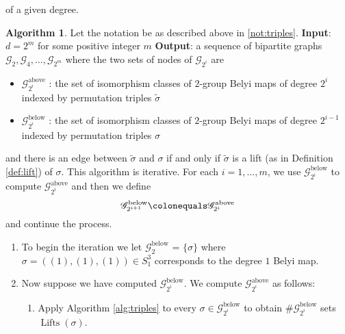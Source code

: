 \documentclass{dcthesis}
\newcommand{\wt}[1]{\widetilde{#1}}
\DeclareMathOperator{\Lifts}{Lifts}
\theoremstyle{definition}
\newtheorem{alg}[prop]{Algorithm}
\theoremstyle{remark}
\numberwithin{equation}{section}
\numberwithin{figure}{section}
\begin{document}
{{    of a given degree.
    \begin{alg}\label{alg:alltriples}
      Let the notation be as described above in \ref{not:triples}.
      \newline
      \textbf{Input}: $d = 2^m$ for some positive integer $m$
      \newline
      \textbf{Output}: a sequence of bipartite graphs
      $\mathscr{G}_2, \mathscr{G}_4,\dots,\mathscr{G}_{2^m}$
      where the two sets of nodes of $\mathscr{G}_{2^i}$
      are
      \begin{itemize}
        \item
          $\mathscr{G}_{2^i}^\text{above}$ :
          the set of isomorphism classes of $2$-group Belyi maps
          of degree $2^i$ indexed by permutation triples $\wt{\sigma}$
        \item
          $\mathscr{G}_{2^i}^\text{below}$ :
          the set of isomorphism classes of $2$-group Belyi maps
          of degree $2^{i-1}$ indexed by permutation triples $\sigma$
      \end{itemize}
      and there is an edge between $\wt{\sigma}$ and $\sigma$
      if and only if $\wt{\sigma}$ is a lift
      (as in Definition \ref{def:lift})
      of $\sigma$.
      This algorithm is iterative.
      For each $i=1,\dots,m$,
      we use $\mathscr{G}_{2^i}^\text{below}$ to
      compute $\mathscr{G}_{2^i}^\text{above}$
      and then we define
      \[
        \mathscr{G}_{2^{i+1}}^\text{below}\colonequals\mathscr{G}_{2^i}^\text{above}
      \]
      and continue the process.
      \begin{enumerate}
        \item
          To begin the iteration we
          let $\mathscr{G}_2^\text{below}$ = $\{\sigma\}$
          where $\sigma = ((1),(1),(1))\in S_1^3$
          corresponds to the degree $1$ Belyi map.
        \item
          Now suppose we have computed $\mathscr{G}_{2^i}^\text{below}$.
          We compute $\mathscr{G}_{2^i}^\text{above}$ as follows:
          \begin{enumerate}
            \item
              Apply Algorithm \ref{alg:triples} to every
              $\sigma\in\mathscr{G}_{2^i}^\text{below}$
              to obtain
              $\#\mathscr{G}_{2^i}^\text{below}$
              sets
              $\Lifts(\sigma)$.

\end{enumerate}
\end{enumerate}
\end{alg}}}
\end{document}
